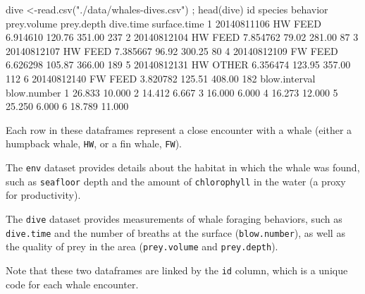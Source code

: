 \documentclass[
]{book}
\newenvironment{Shaded}{\begin{snugshade}}{\end{snugshade}}
\newcommand{\DecValTok}[1]{\textcolor[rgb]{0.00,0.00,0.81}{#1}}
\newcommand{\FloatTok}[1]{\textcolor[rgb]{0.00,0.00,0.81}{#1}}
\newcommand{\FunctionTok}[1]{\textcolor[rgb]{0.00,0.00,0.00}{#1}}
\newcommand{\NormalTok}[1]{#1}
\newcommand{\OtherTok}[1]{\textcolor[rgb]{0.56,0.35,0.01}{#1}}
\newcommand{\StringTok}[1]{\textcolor[rgb]{0.31,0.60,0.02}{#1}}
\begin{document}
\begin{Shaded}
\begin{Highlighting}[]
\NormalTok{dive }\OtherTok{\textless{}{-}}\FunctionTok{read.csv}\NormalTok{(}\StringTok{"./data/whales{-}dives.csv"}\NormalTok{) ; }\FunctionTok{head}\NormalTok{(dive)}
\NormalTok{           id species behavior prey.volume prey.depth dive.time surface.time}
\DecValTok{1} \DecValTok{20140811106}\NormalTok{      HW     FEED    }\FloatTok{6.914610}     \FloatTok{120.76}    \FloatTok{351.00}          \DecValTok{237}
\DecValTok{2} \DecValTok{20140812104}\NormalTok{      HW     FEED    }\FloatTok{7.854762}      \FloatTok{79.02}    \FloatTok{281.00}           \DecValTok{87}
\DecValTok{3} \DecValTok{20140812107}\NormalTok{      HW     FEED    }\FloatTok{7.385667}      \FloatTok{96.92}    \FloatTok{300.25}           \DecValTok{80}
\DecValTok{4} \DecValTok{20140812109}\NormalTok{      FW     FEED    }\FloatTok{6.626298}     \FloatTok{105.87}    \FloatTok{366.00}          \DecValTok{189}
\DecValTok{5} \DecValTok{20140812131}\NormalTok{      HW    OTHER    }\FloatTok{6.356474}     \FloatTok{123.95}    \FloatTok{357.00}          \DecValTok{112}
\DecValTok{6} \DecValTok{20140812140}\NormalTok{      FW     FEED    }\FloatTok{3.820782}     \FloatTok{125.51}    \FloatTok{408.00}          \DecValTok{182}
\NormalTok{  blow.interval blow.number}
\DecValTok{1}        \FloatTok{26.833}      \FloatTok{10.000}
\DecValTok{2}        \FloatTok{14.412}       \FloatTok{6.667}
\DecValTok{3}        \FloatTok{16.000}       \FloatTok{6.000}
\DecValTok{4}        \FloatTok{16.273}      \FloatTok{12.000}
\DecValTok{5}        \FloatTok{25.250}       \FloatTok{6.000}
\DecValTok{6}        \FloatTok{18.789}      \FloatTok{11.000}
\end{Highlighting}
\end{Shaded}

Each row in these dataframes represent a close encounter with a whale (either a humpback whale, \texttt{HW}, or a fin whale, \texttt{FW}).

The \texttt{env} dataset provides details about the habitat in which the whale was found, such as \texttt{seafloor} depth and the amount of \texttt{chlorophyll} in the water (a proxy for productivity).

The \texttt{dive} dataset provides measurements of whale foraging behaviors, such as \texttt{dive.time} and the number of breaths at the surface (\texttt{blow.number}), as well as the quality of prey in the area (\texttt{prey.volume} and \texttt{prey.depth}).

Note that these two dataframes are linked by the \texttt{id} column, which is a unique code for each whale encounter.
\end{document}
